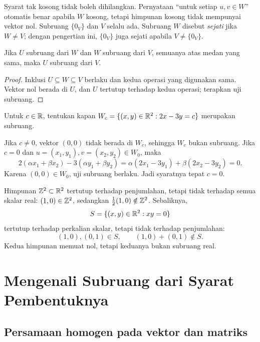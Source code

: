 Syarat tak kosong tidak boleh dihilangkan. Pernyataan
``untuk setiap $u,v\in W$'' otomatis benar apabila $W$ kosong,
tetapi himpunan kosong tidak mempunyai vektor nol.
Subruang $\{0_V\}$ dan $V$ selalu ada. Subruang $W$ disebut
\emph{sejati} jika $W\ne V$; dengan pengertian ini,
$\{0_V\}$ juga sejati apabila $V\ne\{0_V\}$.

\begin{prop}
    Jika $U$ subruang dari $W$ dan $W$ subruang dari $V$,
    semuanya atas medan yang sama, maka $U$ subruang dari $V$.
\end{prop}
\begin{proof}
    Inklusi $U\subseteq W\subseteq V$ berlaku dan kedua operasi
    yang digunakan sama. Vektor nol berada di $U$, dan $U$
    tertutup terhadap kedua operasi; terapkan uji subruang.
\end{proof}

\begin{exam}
    Untuk $c\in\mathbb{R}$, tentukan kapan
    $W_c=\{(x,y)\in\mathbb{R}^2:2x-3y=c\}$ merupakan subruang.
\end{exam}
\begin{solution}
    Jika $c\ne0$, vektor $(0,0)$ tidak berada di $W_c$, sehingga
    $W_c$ bukan subruang.
    Jika $c=0$ dan $u=(x_1,y_1),v=(x_2,y_2)\in W_0$, maka
    \[
        2(\alpha x_1+\beta x_2)-3(\alpha y_1+\beta y_2)
        =\alpha(2x_1-3y_1)+\beta(2x_2-3y_2)=0.
    \]
    Karena $(0,0)\in W_0$, uji subruang berlaku.
    Jadi syaratnya tepat $c=0$.
\end{solution}

\begin{exam}
    Himpunan $\mathbb{Z}^2\subset\mathbb{R}^2$ tertutup terhadap penjumlahan,
    tetapi tidak terhadap semua skalar real: $(1,0)\in\mathbb{Z}^2$,
    sedangkan $\tfrac12(1,0)\notin\mathbb{Z}^2$.
    Sebaliknya,
    \[
        S=\{(x,y)\in\mathbb{R}^2:xy=0\}
    \]
    tertutup terhadap perkalian skalar, tetapi tidak terhadap penjumlahan:
    \[
        (1,0),(0,1)\in S,\qquad (1,0)+(0,1)\notin S.
    \]
    Kedua himpunan memuat nol, tetapi keduanya bukan subruang real.
\end{exam}

\section{Mengenali Subruang dari Syarat Pembentuknya}
\label{linear:kendala}

\subsection{Persamaan homogen pada vektor dan matriks}

